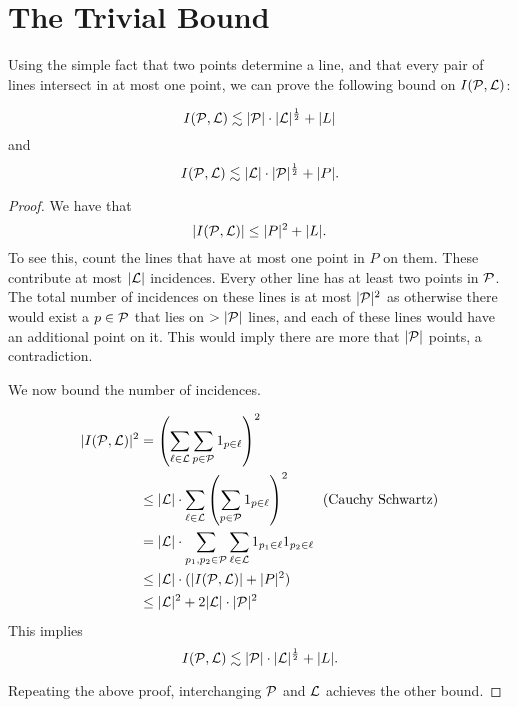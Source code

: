 \section{The Trivial Bound}
Using the simple fact that two points determine a line, and that every pair of lines intersect in at most one point, 
we can prove the following bound on $I(\mathcal P,\mathcal L)$:
\begin{theorem}
    $$I(\mathcal P,\mathcal L) \lesssim |\mathcal P|\cdot |\mathcal L|^{\frac{1}{2}} + |L|$$
    and
    $$I(\mathcal P,\mathcal L) \lesssim |\mathcal L|\cdot |\mathcal P|^{\frac{1}{2}} + |P|.$$
\end{theorem}
\begin{proof}
    

We have that 
$$|I(\mathcal P,\mathcal L)| \leq |P|^2 + |L|.$$
To see this, count the lines that have at most one point in $P$ on them. These contribute at most $|\mathcal L|$ incidences.
Every other line has at least two points in $\mathcal P$. The total number of incidences on these lines is at most $|\mathcal P|^2$
as otherwise there would exist a $p\in \mathcal P$ that lies on $> |\mathcal P|$ lines, and each of these lines would have an additional 
point on it. This would imply there are more that $|\mathcal P|$ points, a contradiction. 

We now bound the number of incidences. 

\begin{align*}
    |I(\mathcal P,\mathcal L)|^2 &= \left( \sum_{\ell \in \mathcal L} \sum_{p \in \mathcal P} 1_{p\in \ell} \right)^2 \\
    & \leq |\mathcal L|\cdot \sum_{\ell \in \mathcal L} \left( \sum_{p \in \mathcal P} 1_{p\in \ell} \right)^2  \qquad \text{ (Cauchy Schwartz)}\\
    &= |\mathcal L|\cdot \sum_{p_1,p_2 \in \mathcal P} \sum_{\ell \in \mathcal L}   1_{p_1\in \ell} 1_{p_2\in \ell}    \\
    & \leq |\mathcal L|\cdot ( |I(\mathcal P,\mathcal L)| + |P|^2)\\
    &\leq |\mathcal L|^2 + 2|\mathcal L|\cdot |\mathcal P|^2 \\ 
\end{align*}    
This implies
$$I(\mathcal P,\mathcal L) \lesssim |\mathcal P|\cdot |\mathcal L|^{\frac{1}{2}} + |L|.$$ 

Repeating the above proof, interchanging $\mathcal P$ and $\mathcal L$ achieves the other bound.
\end{proof}

